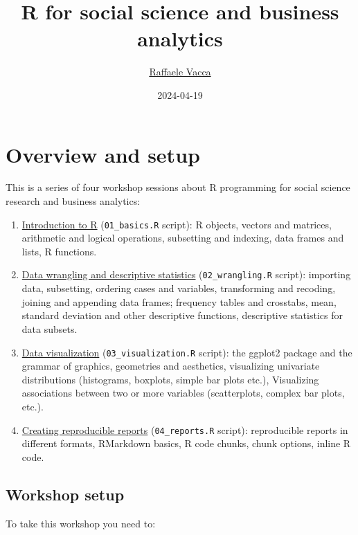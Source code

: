 \documentclass[
]{book}
\title{R for social science and business analytics}
\author{\href{http://www.raffaelevacca.com/}{Raffaele Vacca}}
\date{2024-04-19}
\providecommand{\tightlist}{%
  \setlength{\itemsep}{0pt}\setlength{\parskip}{0pt}}
\begin{document}
\maketitle

{
\setcounter{tocdepth}{1}
\tableofcontents
}
\hypertarget{overview-and-setup}{%
\chapter{Overview and setup}\label{overview-and-setup}}

This is a series of four workshop sessions about R programming for social science research and business analytics:

\begin{enumerate}
\def\labelenumi{\arabic{enumi}.}
\tightlist
\item
  \protect\hyperlink{intro}{Introduction to R} (\texttt{01\_basics.R} script): R objects, vectors and matrices, arithmetic and logical operations, subsetting and indexing, data frames and lists, R functions.
\item
  \protect\hyperlink{wrangling}{Data wrangling and descriptive statistics} (\texttt{02\_wrangling.R} script): importing data, subsetting, ordering cases and variables, transforming and recoding, joining and appending data frames; frequency tables and crosstabs, mean, standard deviation and other descriptive functions, descriptive statistics for data subsets.
\item
  \protect\hyperlink{visualization}{Data visualization} (\texttt{03\_visualization.R} script): the ggplot2 package and the grammar of graphics, geometries and aesthetics, visualizing univariate distributions (histograms, boxplots, simple bar plots etc.), Visualizing associations between two or more variables (scatterplots, complex bar plots, etc.).
\item
  \protect\hyperlink{reproducible}{Creating reproducible reports} (\texttt{04\_reports.R} script): reproducible reports in different formats, RMarkdown basics, R code chunks, chunk options, inline R code.
\end{enumerate}

\hypertarget{setup}{%
\section{Workshop setup}\label{setup}}

To take this workshop you need to:
\end{document}
